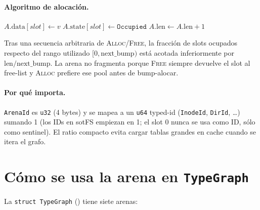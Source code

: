 \paragraph{Algoritmo de alocación.}

\begin{algorithm}[H]
\SetAlgoLined
{}
\caption{\textsc{Arena.Alloc}}\label{alg:arena-alloc}

$A.\textrm{data}[\textit{slot}] \gets v$\;
$A.\textrm{state}[\textit{slot}] \gets \texttt{Occupied}$\;
$A.\textrm{len} \gets A.\textrm{len} + 1$\;
\;
\end{algorithm}

\begin{lema}
\label{lem:arena-densidad}
Tras una secuencia arbitraria de \textsc{Alloc}/\textsc{Free}, la
fracción de slots ocupados respecto del rango utilizado
$[0, \textrm{next\_bump})$ está acotada inferiormente por
$\textrm{len}/\textrm{next\_bump}$. La arena no fragmenta porque
\textsc{Free} siempre devuelve el slot al free-list y \textsc{Alloc}
prefiere ese pool antes de bump-alocar.
\end{lema}

\paragraph{Por qué importa.} \texttt{ArenaId} es \texttt{u32} (4 bytes)
y se mapea a un \texttt{u64} typed-id (\texttt{InodeId}, \texttt{DirId},
\dots) sumando 1 (los IDs en sotFS empiezan en 1; el slot 0 nunca se usa
como ID, sólo como sentinel). El ratio compacto evita cargar tablas
grandes en cache cuando se itera el grafo.

\section{Cómo se usa la arena en \texttt{TypeGraph}}

La \texttt{struct TypeGraph} ()
tiene siete arenas:

